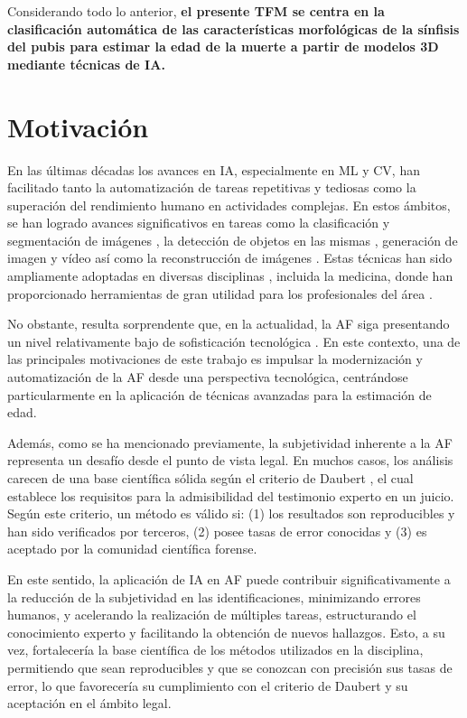 Considerando todo lo anterior, \textbf{el presente TFM se centra en la clasificación automática de las características morfológicas de la sínfisis del pubis para estimar la edad de la muerte a partir de modelos 3D mediante técnicas de IA.}

\section{Motivación}
En las últimas décadas los avances en IA, especialmente en ML y CV, han facilitado tanto la automatización de tareas repetitivas y tediosas como la superación del rendimiento humano en actividades complejas. En estos ámbitos, se han logrado avances significativos en tareas como la clasificación y segmentación de imágenes \cite{edozie_comprehensive_2025}, la detección de objetos en las mismas \cite{liu_deep_2020}, generación de imagen y vídeo \cite{wang_generative_2021} así como la reconstrucción de imágenes \cite{xie_review_2022}. Estas técnicas han sido ampliamente adoptadas en diversas disciplinas \cite{chai_deep_2021}, incluida la medicina, donde han proporcionado herramientas de gran utilidad para los profesionales del área \cite{esteva_deep_2021}.

No obstante, resulta sorprendente que, en la actualidad, la AF siga presentando un nivel relativamente bajo de sofisticación tecnológica \cite{RefWorks:RefID:21-mesejo2020survey}. En este contexto, una de las principales motivaciones de este trabajo es impulsar la modernización y automatización de la AF desde una perspectiva tecnológica, centrándose particularmente en la aplicación de técnicas avanzadas para la estimación de edad.

Además, como se ha mencionado previamente, la subjetividad inherente a la AF representa un desafío desde el punto de vista legal. En muchos casos, los análisis carecen de una base científica sólida según el criterio de Daubert \cite{noauthor_daubert_nodate}, el cual establece los requisitos para la admisibilidad del testimonio experto en un juicio. Según este criterio, un método es válido si: (1) los resultados son reproducibles y han sido verificados por terceros, (2) posee tasas de error conocidas y (3) es aceptado por la comunidad científica forense.

En este sentido, la aplicación de IA en AF puede contribuir significativamente a la reducción de la subjetividad en las identificaciones, minimizando errores humanos, y acelerando la realización de múltiples tareas, estructurando el conocimiento experto y facilitando la obtención de nuevos hallazgos. Esto, a su vez, fortalecería la base científica de los métodos utilizados en la disciplina, permitiendo que sean reproducibles y que se conozcan con precisión sus tasas de error, lo que favorecería su cumplimiento con el criterio de Daubert y su aceptación en el ámbito legal.

